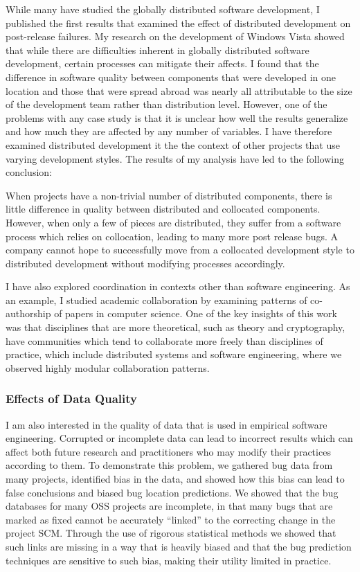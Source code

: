 \documentclass[10pt]{article}
\newcommand\Subsection[1]{\subsubsection*{\small #1}}
\begin{document}
\begin{small}
While many have studied the globally distributed software development, I
published the first results that examined the effect of distributed development
on post-release failures.  My research on the development of Windows Vista
showed that while there are difficulties inherent in globally distributed
software development, certain processes can mitigate their affects.  I found
that the difference in software quality between components that were developed
in one location and those that were spread abroad was nearly all attributable
to the size of the development team rather than distribution level.  However, one of the problems with any
case study is that it is unclear how well the results generalize and how much
they are affected by any number of variables.   I have therefore examined
distributed development it the the context of other projects that use varying
development styles. The results of my analysis have led to the following
conclusion:

When projects have a non-trivial number of distributed components, there is
little difference in quality between distributed and collocated components.
However, when only a few of pieces are distributed, they suffer from a software
process which relies on collocation, leading to many more post release bugs.  A
company cannot hope to successfully move from a collocated development style to
distributed development without modifying processes accordingly.

I have also explored coordination in contexts other than software engineering.
As an example, I studied academic collaboration by examining patterns of
co-authorship of papers in computer science.  One of the key insights of this
work was that disciplines that are more theoretical, such as theory and
cryptography, have communities which tend to collaborate more freely than
disciplines of practice, which include distributed systems and software
engineering, where we observed highly modular collaboration patterns.


\Subsection{Effects of Data Quality}

I am also interested in the quality of data that is used in empirical software
engineering.  Corrupted or incomplete data can lead to incorrect results which
can affect both future research and practitioners who may modify their
practices according to them.  To demonstrate this problem, we gathered bug data
from many projects, identified bias in the data, and showed how this bias can
lead to false conclusions and biased bug location predictions.
We showed that the bug databases for many
OSS projects are incomplete, in that many bugs that are marked as fixed cannot
be accurately ``linked'' to the correcting change in the project SCM.  Through
the use of rigorous statistical methods we showed that such links are missing
in a way that is heavily biased and that the bug prediction techniques are 
sensitive to such bias, making their utility limited in practice.


\end{small}
\end{document}
